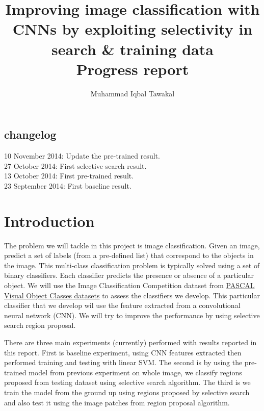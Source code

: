 \documentclass{article}
\author{Muhammad Iqbal Tawakal}
\title{Improving image classification with CNNs by exploiting selectivity in search \& training data\\Progress report}
\begin{document}
\maketitle

\subsection*{changelog}
10 November 2014: Update the pre-trained result. \\
27 October 2014: First selective search result. \\
13 October 2014: First pre-trained result. \\
23 September 2014: First baseline result.

\section{Introduction}
The problem we will tackle in this project is image
classification. Given an image, predict a set of labels (from a
pre-defined list) that correspond to the objects in the image. This multi-class classification problem is typically solved using a set of binary classifiers. Each classifier predicts the presence or absence of a particular object. We will use the Image Classification Competition dataset from \href{http://pascallin.ecs.soton.ac.uk/challenges/VOC/}{PASCAL Visual Object Classes datasets} to assess the classifiers we develop. This particular classifier that we develop wil use the feature extracted from a convolutional neural network (CNN). We will try to improve the performance by using selective search region proposal.

There are three main experiments (currently) performed with results reported in this report.
First is baseline experiment, using CNN features extracted then performed training and testing with linear SVM.
The second is by using the pre-trained model from previous experiment on whole image, we classify regions proposed from testing dataset using selective search algorithm.
The third is we train the model from the ground up using regions proposed by selective search and also test it using the image patches from region proposal algorithm.
\end{document}
